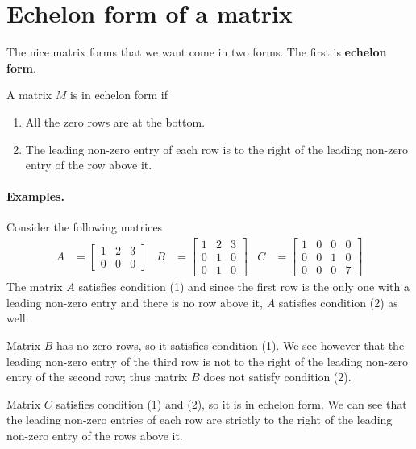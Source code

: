 \documentclass[11pt]{article}
\newcommand{\keyphrase}{\textbf}
\begin{document}
\section*{Echelon form of a matrix}
The nice matrix forms that we want come in two forms. The first is \keyphrase{echelon form}.

\begin{minipage}[t]{.95\textwidth}
A matrix $M$ is in echelon form if
\begin{enumerate}
\item{
All the zero rows are at the bottom.
}
\item{
The leading non-zero entry of each row is to the right of the leading non-zero entry of the row above it.
}
\end{enumerate}
\end{minipage}

\paragraph{Examples.}
Consider the following matrices
\begin{align*}
A &= \begin{bmatrix}
1 & 2 & 3
\\
0 & 0 & 0
\end{bmatrix}
&
B &= \begin{bmatrix}
1 & 2 & 3
\\
0 & 1 & 0
\\
0 & 1 & 0
\end{bmatrix}
&
C &= \begin{bmatrix}
1 & 0 & 0 & 0
\\
0 & 0 & 1 & 0
\\
0 & 0 & 0 & 7
\end{bmatrix}
\end{align*}
The matrix $A$ satisfies condition (1) and since the first row is the only one with a leading non-zero entry and there is no row above it, $A$ satisfies condition (2) as well.

Matrix $B$ has no zero rows, so it satisfies condition (1). We see however that the leading non-zero entry of the third row is not to the right of the leading non-zero entry of the second row; thus matrix $B$ does not satisfy condition (2).

Matrix $C$ satisfies condition (1) and (2), so it is in echelon form. We can see that the leading non-zero entries of each row are strictly to the right of the leading non-zero entry of the rows above it.
\end{document}
